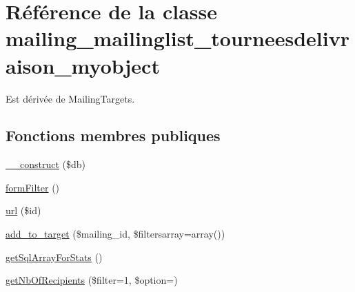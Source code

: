\hypertarget{classmailing__mailinglist__tourneesdelivraison__myobject}{}\section{Référence de la classe mailing\+\_\+mailinglist\+\_\+tourneesdelivraison\+\_\+myobject}
\label{classmailing__mailinglist__tourneesdelivraison__myobject}


Est dérivée de Mailing\+Targets.

\subsection*{Fonctions membres publiques}
\begin{DoxyCompactItemize}
\item 
\hyperlink{classmailing__mailinglist__tourneesdelivraison__myobject_a2ddefa0c8d7c4d4424cb624f099ddc50}{\+\_\+\+\_\+construct} (\$db)
\item 
\hyperlink{classmailing__mailinglist__tourneesdelivraison__myobject_a13b846a334b6148078a47ec8ead4bc26}{form\+Filter} ()
\item 
\hyperlink{classmailing__mailinglist__tourneesdelivraison__myobject_a107c4f36f0111b41925b8cf3a41cf9c4}{url} (\$id)
\item 
\hyperlink{classmailing__mailinglist__tourneesdelivraison__myobject_a0fc2ef2c62f27faa68c26869786d49bd}{add\+\_\+to\+\_\+target} (\$mailing\+\_\+id, \$filtersarray=array())
\item 
\hyperlink{classmailing__mailinglist__tourneesdelivraison__myobject_ad68b6f47768b8e66db4147c291149fb9}{get\+Sql\+Array\+For\+Stats} ()
\item 
\hyperlink{classmailing__mailinglist__tourneesdelivraison__myobject_a9d0b432b1818ae755358ce91e5e75390}{get\+Nb\+Of\+Recipients} (\$filter=1, \$option=\textquotesingle{}\textquotesingle{})
\end{DoxyCompactItemize}
